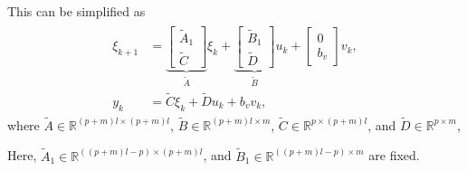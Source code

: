 %
This can be simplified as
\begin{align}
\begin{split}
\label{eq:extended_sys2}
\xi_{k+1} &= 
\underbrace{\begin{bmatrix} 
\widetilde{A}_1 \\
\widetilde{C} \end{bmatrix} }_{\widetilde{A}}
\xi_k + \underbrace{\begin{bmatrix} \widetilde{B}_1 \\ \widetilde{D} \end{bmatrix}}_{\widetilde{B}} u_{k} + \begin{bmatrix} 0 \\  b_v \end{bmatrix} v_{k}, \\
y_k &= \widetilde{C} \xi_k + \widetilde{D} u_k + b_v v_{k},
\end{split} 
\end{align}
where $\widetilde{A}\in\mathbb{R}^{(p+m)l \times (p+m)l}$, $\widetilde{B}\in\mathbb{R}^{(p+m)l\times m}$, $\widetilde{C} \in \mathbb{R}^{p \times (p+m)l}$, and $\widetilde{D} \in \mathbb{R}^{p \times m}$, 

Here, $\widetilde{A}_1 \in \mathbb{R}^{((p+m)l-p) \times (p+m)l}$, and $\widetilde{B}_1 \in \mathbb{R}^{((p+m)l-p) \times m}$ are fixed.

